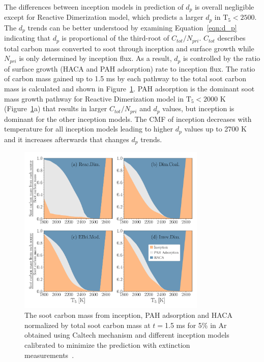 The differences between inception models in prediction of $d_p$  is overall negligible except for Reactive Dimerization model, which predicts a larger $d_p$ in $\mathrm{T_5}<2500$. The $d_p$ trends can be better understood by examining Equation~\eqref{eqn:d_p} indicating that $d_p$ is proportional of the third-root of $C_{tot}/N_{pri}$. $C_{tot}$ describes total carbon mass converted to soot through inception and surface growth while $N_{pri}$ is only determined by inception flux. As a result, $d_p$ is controlled by the ratio of surface growth (HACA and PAH adsorption) rate to inception flux. The ratio of carbon mass gained up to 1.5 ms by each pathway to the total soot carbon mass is calculated and shown in Figure~\ref{fig:shockagof_carbon_map_cpr}. PAH adsorption is the dominant soot mass growth pathway for Reactive Dimerization model in $\mathrm{T_5}<2000$ K (Figure~\ref{fig:shockagof_carbon_map_cpr}a) that results in larger $C_{tot}/N_{pri}$ and $d_p$ values, but inception is dominant for the other inception models. The CMF of inception decreases with temperature for all inception models leading to higher $d_p$ values up to 2700 K and it increases afterwards that changes $d_p$ trends.


\begin{figure}[H]
	\centering
	\includegraphics[width=0.8\textwidth]{Figures/Results/Shocktube/Agafonov2016_cpr/C_tot_distmap_5CH4.pdf}
	\caption{The soot carbon mass from inception, PAH adsorption and HACA normalized by total soot carbon mass at $t=$1.5 ms for 5\% in Ar obtained using Caltech mechanism and different inception models calibrated to minimize the prediction with extinction measurements~\citep{agafonov2016unified}.}
	\label{fig:shockagof_carbon_map_cpr} 
\end{figure}


